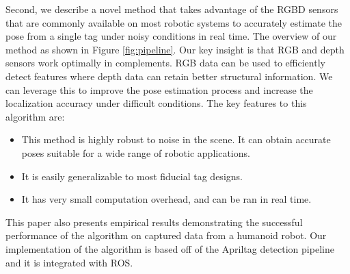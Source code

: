 Second, we describe a novel method that takes advantage of the RGBD sensors that are commonly available on most robotic systems to accurately estimate the pose from a single tag under noisy conditions in real time. The overview of our method as shown in Figure \ref{fig:pipeline}. Our key insight is that RGB and depth sensors work optimally in complements. RGB data can be used to efficiently detect features where depth data can retain better structural information. We can leverage this to improve the pose estimation process and increase the localization accuracy under difficult conditions. The key features to this algorithm are: 
\begin{itemize}
\item This method is highly robust to noise in the scene. It can obtain accurate poses suitable for a wide range of robotic applications.   
\item It is easily generalizable to most fiducial tag designs.
\item It has very small computation overhead, and can be ran in real time. 
\end{itemize}

This paper also presents empirical results demonstrating the successful performance of the algorithm on captured data from a humanoid robot. Our implementation of the algorithm is based off of the Apriltag detection pipeline and it is integrated with ROS. 